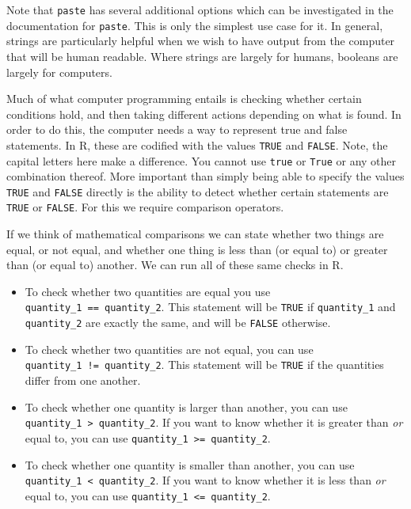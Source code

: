 \documentclass[
  letterpaper,
  DIV=11,
  numbers=noendperiod]{scrreprt}
\providecommand{\tightlist}{%
  \setlength{\itemsep}{0pt}\setlength{\parskip}{0pt}}\usepackage{longtable,booktabs,array}
\theoremstyle{definition}
\theoremstyle{definition}
\theoremstyle{definition}
\theoremstyle{remark}
\begin{document}
Note that \texttt{paste} has several additional options which can be
investigated in the documentation for \texttt{paste}. This is only the
simplest use case for it. In general, strings are particularly helpful
when we wish to have output from the computer that will be human
readable. Where strings are largely for humans, booleans are largely for
computers.

Much of what computer programming entails is checking whether certain
conditions hold, and then taking different actions depending on what is
found. In order to do this, the computer needs a way to represent true
and false statements. In R, these are codified with the values
\texttt{TRUE} and \texttt{FALSE}. Note, the capital letters here make a
difference. You cannot use \texttt{true} or \texttt{True} or any other
combination thereof. More important than simply being able to specify
the values \texttt{TRUE} and \texttt{FALSE} directly is the ability to
detect whether certain statements are \texttt{TRUE} or \texttt{FALSE}.
For this we require comparison operators.

If we think of mathematical comparisons we can state whether two things
are equal, or not equal, and whether one thing is less than (or equal
to) or greater than (or equal to) another. We can run all of these same
checks in R.

\begin{itemize}
\tightlist
\item
  To check whether two quantities are equal you use
  \texttt{quantity\_1\ ==\ quantity\_2}. This statement will be
  \texttt{TRUE} if \texttt{quantity\_1} and \texttt{quantity\_2} are
  exactly the same, and will be \texttt{FALSE} otherwise.
\item
  To check whether two quantities are not equal, you can use
  \texttt{quantity\_1\ !=\ quantity\_2}. This statement will be
  \texttt{TRUE} if the quantities differ from one another.
\item
  To check whether one quantity is larger than another, you can use
  \texttt{quantity\_1\ \textgreater{}\ quantity\_2}. If you want to know
  whether it is greater than \emph{or} equal to, you can use
  \texttt{quantity\_1\ \textgreater{}=\ quantity\_2}.
\item
  To check whether one quantity is smaller than another, you can use
  \texttt{quantity\_1\ \textless{}\ quantity\_2}. If you want to know
  whether it is less than \emph{or} equal to, you can use
  \texttt{quantity\_1\ \textless{}=\ quantity\_2}.
\end{itemize}
\end{document}
